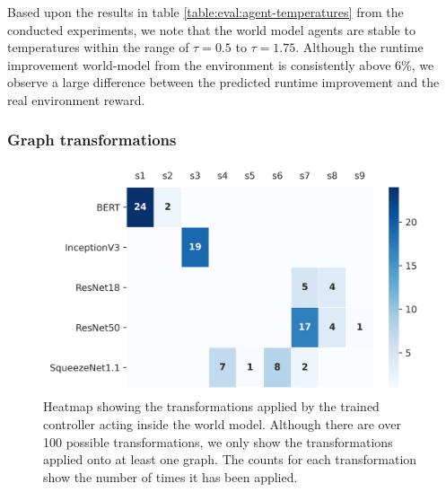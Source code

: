 Based upon the results in table \ref{table:eval:agent-temperatures} from the conducted experiments, we note that the world model agents are stable to temperatures within the range of $\tau = 0.5$ to $\tau = 1.75$. Although the runtime improvement world-model from the environment is consistently above 6\%, we observe a large difference between the predicted runtime improvement and the real environment reward.



\subsubsection{Graph transformations}

\begin{figure}[ht]
  \centering
  \includegraphics[width=1\columnwidth]{sections/5evaluation/images/xfer_heatmap}
  \caption[Heatmap of graph transformations applied by MB controller]{Heatmap showing the transformations applied by the trained controller acting inside the world model. Although there are over 100 possible transformations, we only show the transformations applied onto at least one graph. The counts for each transformation show the number of times it has been applied.}
  \label{fig:eval:xfer-heatmap}
\end{figure}

